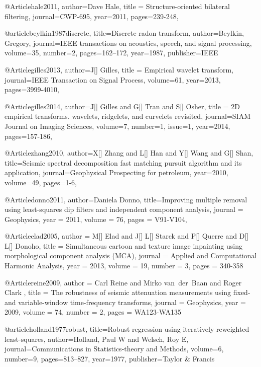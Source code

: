 @Article{hale2011,
  author={Dave Hale},
  title = {Structure-oriented bilateral filtering},
  journal={CWP-695},
  year=2011,
  pages={239-248},
}

@article{beylkin1987discrete,
  title={Discrete radon transform},
  author={Beylkin, Gregory},
  journal={IEEE transactions on acoustics, speech, and signal processing},
  volume={35},
  number={2},
  pages={162--172},
  year={1987},
  publisher={IEEE}
}


@Article{gilles2013,
  author={J[] Gilles},
  title = {Empirical wavelet transform},
  journal={IEEE Transaction on Signal Process},
  volume={61},
  year=2013,
  pages={3999-4010},
}

@Article{gilles2014,
  author={J[] Gilles and G[] Tran and S[] Osher},
  title = {2D empirical transforms. wavelets, ridgelets, and curvelets revisited},
  journal={SIAM Journal on Imaging Sciences},
  volume={7},
  number=1,
  issue=1,
  year=2014,
  pages={157-186},
}




@Article{zhang2010,
  author={X[] Zhang and L[] Han and Y[] Wang and G[] Shan},
  title={Seismic spectral decomposition fast matching pursuit algorithm and its application},
  journal={Geophysical Prospecting for petroleum},
  year=2010,
  volume=49,
  pages={1-6},
}

@Article{donno2011,
  author={Daniela Donno},
  title={Improving multiple removal using least-squares dip filters
and independent component analysis},
  journal = 	 {Geophysics},
  year = 	 2011,
  volume =	 76,
  pages =	 {V91-V104},
}

@Article{elad2005,
  author = 	 {M[] Elad and J[] L[] Starck and P[] Querre and D[] L[] Donoho},
  title = 	 {Simultaneous cartoon and texture image inpainting using morphological component analysis (MCA)},
  journal = 	 {Applied and Computational Harmonic Analysis},
  year = 	 2013,
  volume = 	 19,
  number = 	 3,
  pages = 	 {340-358}}

@Article{reine2009,
  author = 	 {Carl Reine and Mirko van~der~Baan and Roger Clark },
  title = 	 {The robustness of seismic attenuation measurements using fixed- and variable-window time-frequency transforms},
  journal = 	 {Geophysics},
  year = 	 2009,
  volume = 	 74,
  number = 	 2,
  pages = 	 {WA123-WA135}}


@article{holland1977robust,
  title={Robust regression using iteratively reweighted least-squares},
  author={Holland, Paul W and Welsch, Roy E},
  journal={Communications in Statistics-theory and Methods},
  volume={6},
  number={9},
  pages={813--827},
  year={1977},
  publisher={Taylor \& Francis}
}

